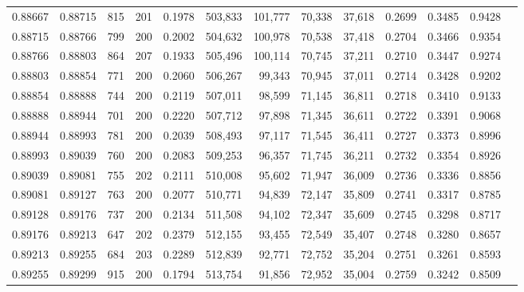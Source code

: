 \begin{tabular}{rrrrrrrrrrrrr}
0.88667 & 0.88715 &   815 & 201 &                                     0.1978 & 503,833 & 101,777 &  70,338 &  37,618 & 0.2699 & 0.3485 & 0.9428 \\
0.88715 & 0.88766 &   799 & 200 &                                     0.2002 & 504,632 & 100,978 &  70,538 &  37,418 & 0.2704 & 0.3466 & 0.9354 \\
0.88766 & 0.88803 &   864 & 207 &                                     0.1933 & 505,496 & 100,114 &  70,745 &  37,211 & 0.2710 & 0.3447 & 0.9274 \\
0.88803 & 0.88854 &   771 & 200 &                                     0.2060 & 506,267 &  99,343 &  70,945 &  37,011 & 0.2714 & 0.3428 & 0.9202 \\
0.88854 & 0.88888 &   744 & 200 &                                     0.2119 & 507,011 &  98,599 &  71,145 &  36,811 & 0.2718 & 0.3410 & 0.9133 \\
0.88888 & 0.88944 &   701 & 200 &                                     0.2220 & 507,712 &  97,898 &  71,345 &  36,611 & 0.2722 & 0.3391 & 0.9068 \\
0.88944 & 0.88993 &   781 & 200 &                                     0.2039 & 508,493 &  97,117 &  71,545 &  36,411 & 0.2727 & 0.3373 & 0.8996 \\
0.88993 & 0.89039 &   760 & 200 &                                     0.2083 & 509,253 &  96,357 &  71,745 &  36,211 & 0.2732 & 0.3354 & 0.8926 \\
0.89039 & 0.89081 &   755 & 202 &                                     0.2111 & 510,008 &  95,602 &  71,947 &  36,009 & 0.2736 & 0.3336 & 0.8856 \\
0.89081 & 0.89127 &   763 & 200 &                                     0.2077 & 510,771 &  94,839 &  72,147 &  35,809 & 0.2741 & 0.3317 & 0.8785 \\
0.89128 & 0.89176 &   737 & 200 &                                     0.2134 & 511,508 &  94,102 &  72,347 &  35,609 & 0.2745 & 0.3298 & 0.8717 \\
0.89176 & 0.89213 &   647 & 202 &                                     0.2379 & 512,155 &  93,455 &  72,549 &  35,407 & 0.2748 & 0.3280 & 0.8657 \\
0.89213 & 0.89255 &   684 & 203 &                                     0.2289 & 512,839 &  92,771 &  72,752 &  35,204 & 0.2751 & 0.3261 & 0.8593 \\
0.89255 & 0.89299 &   915 & 200 &                                     0.1794 & 513,754 &  91,856 &  72,952 &  35,004 & 0.2759 & 0.3242 & 0.8509 \\

\end{tabular}
